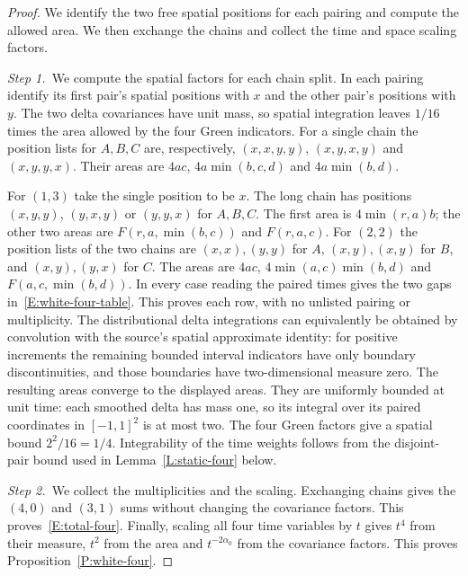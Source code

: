 \documentclass[12pt,oneside,openany]{book}
\numberwithin{equation}{section}
\theoremstyle{nogostyle}
\theoremstyle{definition}
\begin{document}
\begin{proof}
  We identify the two free spatial positions for each pairing and compute the
  allowed area. We then exchange the chains and collect the time and space
  scaling factors.


  \medskip
  \noindent\textit{Step 1.~}We compute the spatial factors for each chain
  split.
  In each pairing identify its first pair's spatial positions with $x$ and the
  other pair's positions with $y$. The two delta covariances have unit mass, so
  spatial integration leaves $1/16$ times the area allowed by the four Green
  indicators. For a single chain the position lists for $A,B,C$ are,
  respectively, $(x,x,y,y)$, $(x,y,x,y)$ and $(x,y,y,x)$. Their areas are $4ac$,
  $4a\min(b,c,d)$ and $4a\min(b,d)$.

  For $(1,3)$ take the single position to be $x$. The long chain has positions
  $(x,y,y)$, $(y,x,y)$ or $(y,y,x)$ for $A,B,C$. The first area is
  $4\min(r,a)b$; the other two areas are $F(r,a,\min(b,c))$ and $F(r,a,c)$. For
  $(2,2)$ the position lists of the two chains are $(x,x),(y,y)$ for $A$,
  $(x,y),(x,y)$ for $B$, and $(x,y),(y,x)$ for $C$. The areas are $4ac$,
  $4\min(a,c)\min(b,d)$ and $F(a,c,\min(b,d))$. In every case reading the paired
  times gives the two gaps in~\eqref{E:white-four-table}. This proves each row,
  with no unlisted pairing or multiplicity. The distributional delta
  integrations can equivalently be obtained by convolution with the source's
  spatial approximate identity: for positive increments the remaining bounded
  interval indicators have only boundary discontinuities, and those boundaries
  have two-dimensional measure zero. The resulting areas converge to the
  displayed areas. They are uniformly bounded at unit time: each smoothed delta
  has mass one, so its integral over its paired coordinates in $[-1,1]^2$ is at
  most two. The four Green factors give a spatial bound $2^2/16 = 1/4$.
  Integrability of the time weights follows from the disjoint-pair bound used in
  Lemma~\ref{L:static-four} below.


  \medskip
  \noindent\textit{Step 2.~}We collect the multiplicities and the scaling.
  Exchanging chains gives the $(4,0)$ and $(3,1)$ sums without changing the
  covariance factors. This proves~\eqref{E:total-four}. Finally, scaling all
  four time variables by $t$ gives $t^4$ from their measure, $t^2$ from the area
  and $t^{-2\alpha_0}$ from the covariance factors. This proves
  Proposition~\ref{P:white-four}.
\end{proof}
\end{document}
